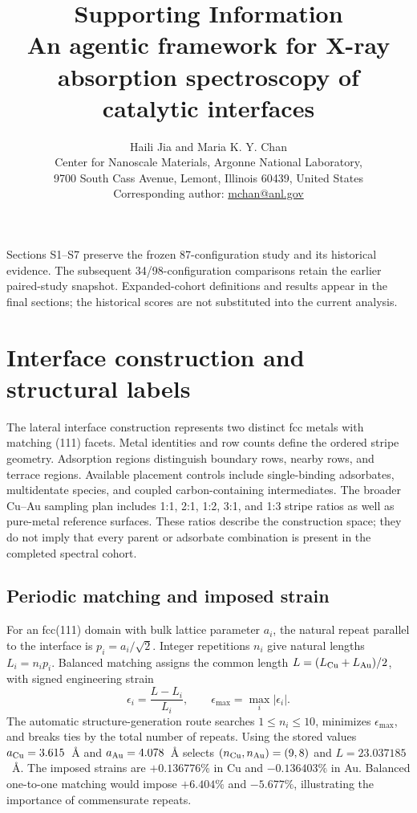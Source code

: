\documentclass[11pt,a4paper]{article}
\title{Supporting Information\\[0.5em]\large An agentic framework for X-ray absorption spectroscopy of catalytic interfaces}
\author{Haili Jia and Maria K. Y. Chan\\[0.5em]
\small Center for Nanoscale Materials, Argonne National Laboratory,\\
\small 9700 South Cass Avenue, Lemont, Illinois 60439, United States\\
\small Corresponding author: \href{mailto:mchan@anl.gov}{mchan@anl.gov}}
\date{}
\begin{document}
\maketitle
\noindent Sections S1--S7 preserve the frozen 87-configuration study and its historical evidence. The subsequent 34/98-configuration comparisons retain the earlier paired-study snapshot. Expanded-cohort definitions and results appear in the final sections; the historical scores are not substituted into the current analysis.
\section{Interface construction and structural labels}
The lateral interface construction represents two distinct fcc metals with matching (111) facets. Metal identities and row counts define the ordered stripe geometry. Adsorption regions distinguish boundary rows, nearby rows, and terrace regions. Available placement controls include single-binding adsorbates, multidentate species, and coupled carbon-containing intermediates. The broader Cu--Au sampling plan includes 1:1, 2:1, 1:2, 3:1, and 1:3 stripe ratios as well as pure-metal reference surfaces. These ratios describe the construction space; they do not imply that every parent or adsorbate combination is present in the completed spectral cohort.

\subsection{Periodic matching and imposed strain}
For an fcc(111) domain with bulk lattice parameter $a_i$, the natural repeat parallel to the interface is $p_i=a_i/\sqrt{2}$. Integer repetitions $n_i$ give natural lengths $L_i=n_i p_i$. Balanced matching assigns the common length $L=(L_{\rm Cu}+L_{\rm Au})/2$, with signed engineering strain
\begin{equation}
\epsilon_i=\frac{L-L_i}{L_i},\qquad
\epsilon_{\max}=\max_i|\epsilon_i|.
\end{equation}
The automatic structure-generation route searches $1\le n_i\le10$, minimizes $\epsilon_{\max}$, and breaks ties by the total number of repeats. Using the stored values $a_{\rm Cu}=3.615$~\AA{} and $a_{\rm Au}=4.078$~\AA{} selects $(n_{\rm Cu},n_{\rm Au})=(9,8)$ and $L=23.037185$~\AA{}. The imposed strains are $+0.136776\%$ in Cu and $-0.136403\%$ in Au. Balanced one-to-one matching would impose $+6.404\%$ and $-5.677\%$, illustrating the importance of commensurate repeats.
\end{document}
